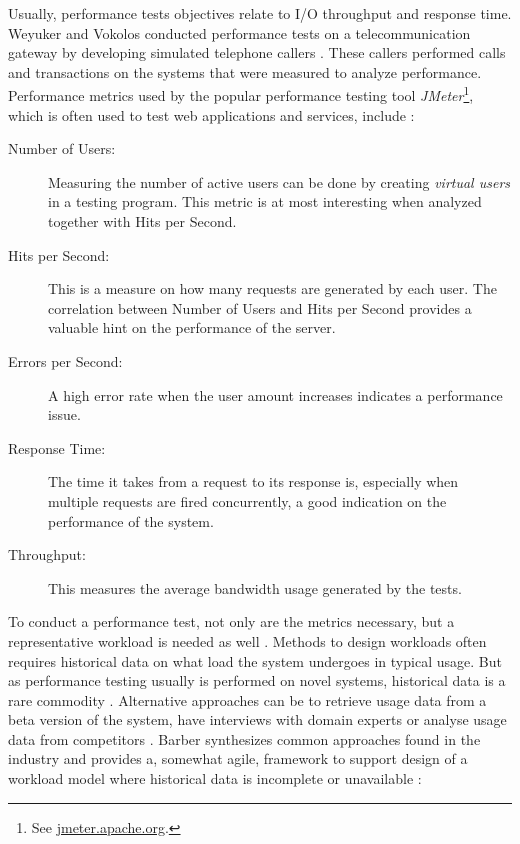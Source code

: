 Usually, performance tests objectives relate to I/O throughput and response
time. Weyuker and Vokolos conducted performance tests on a telecommunication
gateway by developing simulated telephone callers \cite{weyuker2000experience}.
These callers performed calls and transactions on the systems that were
measured to analyze performance. Performance metrics used by the popular
performance testing tool \textit{JMeter}\footnote{See
\url{jmeter.apache.org}.}, which is often used to test web applications and
services, include \cite{mendelawy2016kpis}:

\begin{description}
  \item[Number of Users:] Measuring the number of active users can be done by
    creating \textit{virtual users} in a testing program. This metric is at
    most interesting when analyzed together with Hits per Second.
  \item[Hits per Second:] This is a measure on how many requests are generated
    by each user. The correlation between Number of Users and Hits per Second
    provides a valuable hint on the performance of the server.
  \item[Errors per Second:] A high error rate when the user amount increases
    indicates a performance issue.
  \item[Response Time:] The time it takes from a request to its response is,
    especially when multiple requests are fired concurrently, a good indication
    on the performance of the system.
  \item[Throughput:] This measures the average bandwidth usage generated by the
    tests.
\end{description}

To conduct a performance test, not only are the metrics necessary, but a
representative workload is needed as well \cite{weyuker2000experience}.
Methods to design workloads often requires historical data on what load the
system undergoes in typical usage. But as performance testing usually is
performed on novel systems, historical data is a rare commodity
\cite{barber2004creating}. Alternative approaches can be to retrieve usage data
from a beta version of the system, have interviews with domain experts or
analyse usage data from competitors \cite{jiang2015survey}. Barber synthesizes
common approaches found in the industry and provides a, somewhat agile,
framework to support design of a workload model where historical data is
incomplete or unavailable \cite{barber2004creating}:

